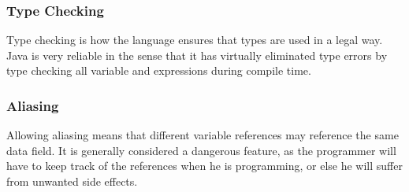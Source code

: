 \subsubsection*{Type Checking}
Type checking is how the language ensures that types are used in a legal way. Java is very reliable in the sense that it has virtually eliminated type errors by type checking all variable and expressions during compile time.
\subsubsection*{Aliasing}
Allowing aliasing means that different variable references may reference the same data field. It is generally considered a dangerous feature, as the programmer will have to keep track of the references when he is programming, or else he will suffer from unwanted side effects.










